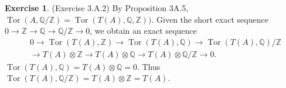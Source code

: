 \documentclass[12pt, psamsfonts]{amsart}
\theoremstyle{definition}
\newtheorem*{exer}{Exercise}
\theoremstyle{remark}
\DeclareMathOperator{\Tor}{Tor}
\numberwithin{equation}{section}
\begin{document}
\begin{exer}{(Exercise 3.A.2)}
  By Proposition 3A.5, $\Tor(A, \mathbb{Q} / \mathbb{Z}) = \Tor(T(A), \mathbb{Q}, \mathbb{Z}))$.
  Given the short exact sequence $0 \rightarrow \mathbb{Z} \rightarrow \mathbb{Q} \rightarrow \mathbb{Q} / \mathbb{Z} \rightarrow 0$, we obtain an exact sequence
  \begin{align*}
    &0 \rightarrow \Tor(T(A), \mathbb{Z}) \rightarrow \Tor(T(A), \mathbb{Q}) \rightarrow \Tor(T(A), \mathbb{Q}) / \mathbb{Z} \\
    &\rightarrow T(A) \otimes \mathbb{Z} \rightarrow T(A) \otimes \mathbb{Q} \rightarrow T(A) \otimes \mathbb{Q} / \mathbb{Z} \rightarrow 0.
  \end{align*}
  $\Tor(T(A), \mathbb{Q}) = T(A) \otimes \mathbb{Q} = 0$.
  Thus $\Tor(T(A), \mathbb{Q} / \mathbb{Z}) = T(A) \otimes \mathbb{Z} = T(A)$.
\end{exer}
\end{document}
